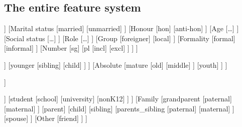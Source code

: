 \documentclass[12pt]{article}
\begin{document}
\begin{landscape}
\section{The entire feature system}
\begin{forest}
[Interpersonal
	[Gender
		[\textsf{male}]
		[\textsf{female}]
	]
	[{Marital status}
		[\textsf{married}]
		[\textsf{unmarried}]
	]
	[Honour
		[\textsf{hon}]
		[\textsf{anti-hon}]
	]
	[Age
		[\ldots]
	]
	[{Social status}
		[\ldots]
	]
	[Role
		[\ldots]
	]
	[Group
		[\textsf{foreigner}]
		[\textsf{local}]
	]
	[Formality
		[\textsf{formal}]
		[\textsf{informal}]
	]
	[Number
		[\textsf{sg}]
		[\textsf{pl}
			[\textsf{incl}]
			[\textsf{excl}]
		]
	]
]
\end{forest}

\begin{forest}
	[Age
		[Relative
			[\textsf{elder}
				[\textsf{grandparent}]
				[\textsf{parents\_}\\\textsf{elder\_sibling}]
				[\textsf{parent}]
				[\textsf{parents\_}\\\textsf{younger\_sibling}]
				[\textsf{sibling}]
			]
			[\textsf{younger}
				[\textsf{sibling}]
				[\textsf{child}]
			]
		]
		[Absolute
			[\textsf{mature}
				[\textsf{old}]
				[\textsf{middle}]
			]
			[\textsf{youth}]
		]
	]
\end{forest}

\begin{forest}
	[{Social status}
		[\textsf{higher}]
		[\textsf{equal\_or\_higher}]
		[\textsf{equal}]
		[\textsf{equal\_or\_lower}]
		[\textsf{lower}]
		[\textsf{neutral}]
	]
\end{forest}

\begin{forest}
	[Role
		[Education
			[\textsf{teacher}
				[\textsf{school}]
				[\textsf{university}]
				[\textsf{nonK12}]
			]
			[\textsf{student}
				[\textsf{school}]
				[\textsf{university}]
				[\textsf{nonK12}]
			]
		]
		[Family
			[\textsf{grandparent}
				[\textsf{paternal}]
				[\textsf{maternal}]
			]
			[\textsf{parent}]
			[\textsf{child}]
			[\textsf{sibling}]
			[\textsf{parents\_sibling}
				[\textsf{paternal}]
				[\textsf{maternal}]
			]
			[\textsf{spouse}]
		]
		[Other
			[\textsf{friend}]
		]
	]
\end{forest}
\end{landscape}
\end{document}
